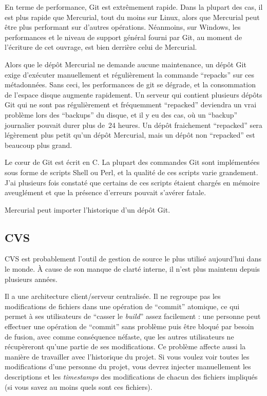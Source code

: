 En terme de performance, Git est extrêmement rapide. Dans la plupart des
cas, il est plus rapide que Mercurial, tout du moins sur Linux, alors que 
Mercurial peut être plus performant sur d'autres opérations. Néanmoins, sur
Windows, les performances et le niveau de support général fourni par Git, 
au moment de l'écriture de cet ouvrage, est bien derrière celui de Mercurial.

Alors que le dépôt Mercurial ne demande aucune maintenance, un dépôt Git
exige d'exécuter manuellement et régulièrement la commande ``repacks'' sur
ces métadonnées. Sans ceci, les performances de git se dégrade, et la 
consommation de l'espace disque augmente rapidement. Un serveur qui contient
plusieurs dépôts Git qui ne sont pas régulièrement et fréquemment ``repacked''
deviendra un vrai problème lors des ``backups'' du disque, et il y eu des
cas, où un ``backup'' journalier pouvait durer plus de~24 heures. Un dépôt
fraichement ``repacked'' sera légèrement plus petit qu'un dépôt Mercurial,
mais un dépôt non ``repacked'' est beaucoup plus grand.

Le cœur de Git est écrit en C. La plupart des commandes Git sont implémentées
sous forme de scripts Shell ou Perl, et la qualité de ces scripts varie
grandement. J'ai plusieurs fois constaté que certains de ces scripts étaient
chargés en mémoire aveuglément et que la présence d'erreurs pouvait s'avérer
fatale.

Mercurial peut importer l'historique d'un dépôt Git.

\subsection{CVS}

CVS est probablement l'outil de gestion de source le plus utilisé aujourd'hui
dans le monde. À cause de son manque de clarté interne, il n'est plus 
maintenu depuis plusieurs années.

Il a une architecture client/serveur centralisée. Il ne regroupe pas les
modifications de fichiers dans une opération de ``commit'' atomique, ce
qui permet à ses utilisateurs de ``casser le \textit{build}'' assez
facilement : une personne peut effectuer une opération de ``commit'' 
sans problème puis être bloqué par besoin de fusion, avec comme conséquence
néfaste, que les autres utilisateurs ne récupèreront qu'une partie de ses
modifications. Ce problème affecte aussi la manière de travailler avec 
l'historique du projet. Si vous voulez voir toutes les modifications d'une
personne du projet, vous devrez injecter manuellement les descriptions et les
\textit{timestamps} des modifications de chacun des fichiers impliqués (si
vous savez au moins quels sont ces fichiers).

